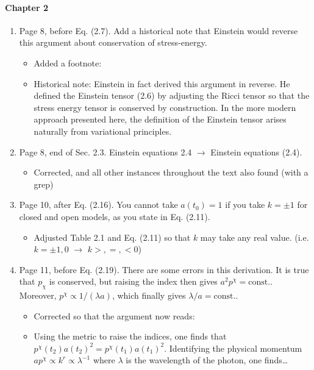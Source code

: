 \documentclass[11pt]{article}
\begin{document}
\paragraph{Chapter 2}
\begin{enumerate}
\item Page 8, before Eq. (2.7). Add a historical note that Einstein
  would reverse this argument about conservation of stress-energy.
  \begin{itemize}
    \item Added a footnote:
    \item Historical note: Einstein in fact derived this argument in reverse. He defined the Einstein tensor (2.6) by adjusting the Ricci tensor so that the stress energy tensor is conserved by construction. In the more modern approach presented here, the definition of the Einstein tensor arises naturally  from variational principles.
  \end{itemize}
\item Page 8, end of Sec. 2.3. Einstein equations 2.4 $\rightarrow$
  Einstein equations (2.4).
  \begin{itemize}
    \item Corrected, and all other instances throughout the text also found (with a grep)
  \end{itemize}
\item Page 10, after Eq. (2.16). You cannot take $a(t_0)=1$ if you
  take $k=\pm 1$ for closed and open models, as you state in
  Eq. (2.11).
  \begin{itemize}
    \item Adjusted Table 2.1 and Eq. (2.11) so that $k$ may take any real value. (i.e. $k=\pm 1,0$ $\rightarrow$ $k>,=,<0$)
  \end{itemize}
\item Page 11, before Eq. (2.19). There are some errors in this
  derivation. It is true that $p_\chi$ is conserved, but raising the
  index then gives $a^2 p^\chi = \text{const.}$. Moreover, $p^\chi
  \propto 1/(\lambda a)$, which finally gives $\lambda / a =
  \text{const.}$. 
  \begin{itemize}
    \item Corrected so that the argument now reads:
    \item Using the metric to raise the indices, one finds that \(p^\chi(t_2){a(t_2)}^2=p^\chi(t_1){a(t_1)}^2\). Identifying the physical momentum \({a p^\chi \propto k^r \propto \lambda^{-1}}\) where \(\lambda\) is the wavelength of the photon, one finds\ldots 
  \end{itemize}

\end{enumerate}
\end{document}
